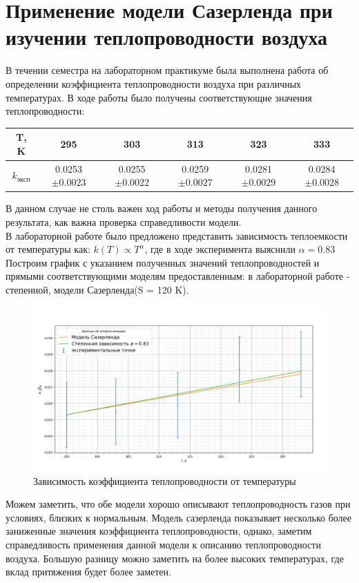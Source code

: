 \documentclass[a4paper, 12pt]{article}%
\begin{document}
	\section{Применение модели Сазерленда при изучении теплопроводности воздуха}
	В течении семестра на лабораторном практикуме была выполнена работа об определении коэффициента теплопроводности воздуха при различных температурах. В ходе работы было получены соответствующие значения теплопроводности:
	\begin{table}[H]
		\centering
		\begin{tabular}{|c|c|c|c|c|c|}
			\hline
			T, K    & 295    & 303    & 313    & 323    & 333    \\ \hline
			$k_{эксп}$ & 0.0253$\pm 0.0023$ & 0.0255$\pm 0.0022$ & 0.0259$\pm 0.0027$ & 0.0281$\pm 0.0029$ & 0.0284$\pm 0.0028$ \\ \hline
		\end{tabular}
	\end{table}
	В данном случае не столь важен ход работы и методы получения данного результата, как важна проверка справедливости модели.\\
	В лабораторной работе было предложено представить зависимость теплоемкости от температуры как: $k(T) \propto T^\alpha$, где в ходе эксперимента выяснили $\alpha = 0.83$
	Построим график с указанием полученных значений теплопроводностей и прямыми соответствующими моделям предоставленным: в лабораторной работе - степенной, модели Сазерленда(S = 120 K).
	\begin{figure}[H]
		\centering
		\includegraphics[width=0.95\linewidth]{Figure_1}
		\caption{Зависимость коэффициента теплопроводности от температуры}
		\label{fig:figure1}
	\end{figure}
	Можем заметить, что обе модели хорошо описывают теплопроводность газов при условиях, близких к нормальным. Модель сазерленда показывает несколько более заниженные значения коэффициента теплопроводности, однако, заметим справедливость применения данной модели к описанию теплопроводности воздуха. Большую разницу можно заметить на более высоких температурах, где вклад притяжения будет более заметен.
\end{document}
